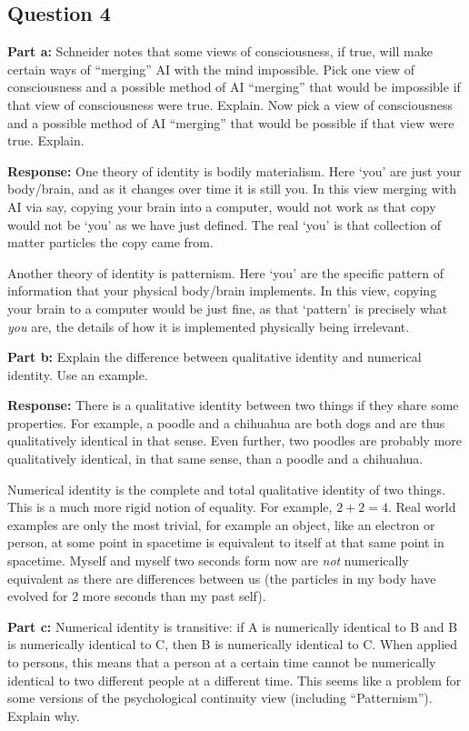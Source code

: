 \documentclass{article}
\begin{document}
\subsection*{Question 4}
\noindent\textbf{Part a:} Schneider notes that some views of consciousness, if true, will make certain ways of ``merging'' AI with the mind impossible. Pick one view of consciousness and a possible method of AI ``merging'' that would be impossible if that view of consciousness were true.  Explain.  Now pick a view of consciousness and a possible method of AI “merging” that would be possible if that view were true. Explain.
\bigskip

\noindent\textbf{Response:} One theory of identity is bodily materialism. Here `you' are just your body/brain, and as it changes over time it is still you. In this view merging with AI via say, copying your brain into a computer, would not work as that copy would not be `you' as we have just defined. The real `you' is that collection of matter particles the copy came from.

Another theory of identity is patternism. Here `you' are the specific pattern of information that your physical body/brain implements. In this view, copying your brain to a computer would be just fine, as that `pattern' is precisely what \textit{you} are, the details of how it is implemented physically being irrelevant.
\bigskip

\noindent\textbf{Part b:} Explain the difference between qualitative identity and numerical identity. Use an example.
\bigskip

\noindent\textbf{Response:} There is a qualitative identity between two things if they share some properties. For example, a poodle and a chihuahua are both dogs and are thus qualitatively identical in that sense. Even further, two poodles are probably more qualitatively identical, in that same sense, than a poodle and a chihuahua.

Numerical identity is the complete and total qualitative identity of two things. This is a much more rigid notion of equality. For example, $2+2=4$. Real world examples are only the most trivial, for example an object, like an electron or person, at some point in spacetime is equivalent to itself at that same point in spacetime. Myself and myself two seconds form now are \textit{not} numerically equivalent as there are differences between us (the particles in my body have evolved for 2 more seconds than my past self).
\bigskip

\noindent\textbf{Part c:} Numerical identity is transitive: if A is numerically identical to B and B is numerically identical to C, then B is  numerically identical to C. When applied to persons, this means that a person at a certain time cannot be numerically identical to two different people at a different time. This seems like a problem for some versions of the psychological continuity view (including ``Patternism''). Explain why.
\bigskip
\end{document}
